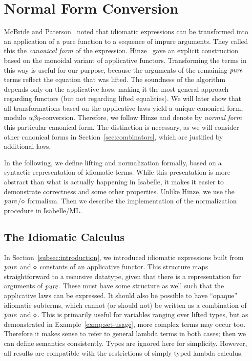 \section{Normal Form Conversion}\label{sec:normal-form}

McBride and Paterson~\cite{mcbride08} noted that idiomatic expressions can
be transformed into an application of a pure function to a sequence of impure
arguments.
They called this the \emph{canonical form} of the expression.
Hinze~\cite[Section~3.3]{hinze10} gave an explicit construction based on the
monoidal variant of applicative functors.  %
Transforming the terms in this way is useful for our purpose, because the
arguments of the remaining $\operatorname{\mathit{pure}}$ terms reflect the equation that was lifted.
The soundness of the algorithm depends only on the applicative laws, making it
the most general approach regarding functors (but not regarding lifted
equalities).
We will later show that all transformations based on the applicative laws yield
a unique canonical form, modulo $\alpha\beta\eta$-conversion.
Therefore, we follow Hinze and denote by \emph{normal form} this particular
canonical form.
The distinction is necessary, as we will consider other canonical forms in
Section~\ref{sec:combinators}, which are justified by additional laws.

In the following, we define lifting and normalization formally, based on a
syntactic representation of idiomatic terms.
While this presentation is more abstract than what is actually happening in
Isabelle, it makes it easier to demonstrate correctness and some other
properties.
Unlike Hinze, we use the $\operatorname{\mathit{pure}}$/$\diamond$ formalism.
Then we describe the implementation of the normalization procedure in
Isabelle/ML.

\subsection{The Idiomatic Calculus}\label{subsec:idiomatic-calculus}

In Section~\ref{subsec:introduction}, we introduced idiomatic expressions built
from $\operatorname{\mathit{pure}}$ and $\diamond$ constants of an applicative functor.
This structure maps straightforward to a recursive datatype, given that there
is a representation for arguments of $\operatorname{\mathit{pure}}$.
These must have some structure as well such that the applicative laws can be
expressed.
It should also be possible to have ``opaque'' idiomatic subterms, which cannot
(or should not) be written as a combination of $\operatorname{\mathit{pure}}$ and $\diamond$.
This is primarily useful for variables ranging over lifted types, but as
demonstrated in Example~\ref{exmp:set-usage}, more complex terms may occur too.
Therefore it makes sense to refer to general lambda terms in both cases;
then we can define semantics consistently.
Types are ignored here for simplicity.
However, all results are compatible with the restrictions of simply typed
lambda calculus.

